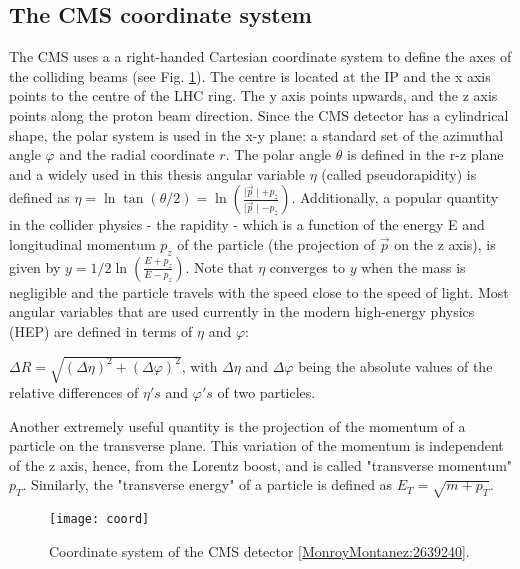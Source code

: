 \begin{normalsize}


\subsection{The CMS coordinate system}

The CMS uses a a right-handed Cartesian coordinate system to define the axes of the colliding beams (see Fig. \ref{coord}). The centre is located at the IP and the x axis points to the centre of the LHC ring. The y axis points upwards, and the z axis points along the proton beam direction. Since the CMS detector has a cylindrical shape, the polar system is used in the x-y plane: a standard set of the azimuthal angle $\varphi$ and the radial coordinate $r$. The polar angle $\theta$ is defined in the r-z plane and a widely used in this thesis angular variable $\eta$ (called pseudorapidity) is defined as $\eta = \ln \tan(\theta/2) = \ln (\frac{\mid \vec{p}\mid + p_z}{\mid \vec{p}\mid - p_z})$. Additionally, a popular quantity in the collider physics - the rapidity - which is a function of the energy E and longitudinal momentum $p_z$ of the particle (the projection of $\vec{p}$ on the z axis), is given by $y = 1/2 \ln ( \frac{E + p_z}{E - p_z})$. Note that $\eta$ converges to $y$ when the mass is negligible and the particle travels with the speed close to the speed of light. Most angular variables that are used currently in the modern high-energy physics (HEP) are defined in terms of $\eta$ and $\varphi$:

$ \Delta R = \sqrt{(\Delta \eta)^2 + (\Delta \varphi)^2}$, with $\Delta \eta$ and $\Delta \varphi$ being the absolute values of the relative differences of $\eta's$ and $\varphi 's$ of two particles. 

Another extremely useful quantity is the projection of the momentum of a particle on the transverse plane. This variation of the momentum is independent of the z axis, hence, from the Lorentz boost, and is called "transverse momentum" $p_T$.  Similarly, the "transverse energy" of a particle is defined as $E_T = \sqrt{m + p_T }$. 


\begin{figure}[H]
  \centering
  \texttt{[image: coord]}
  \caption[Coordinate system of the CMS detector]{Coordinate system of the CMS detector \ref{MonroyMontanez:2639240}.}
  \label{coord}
\end{figure}



\end{normalsize}
